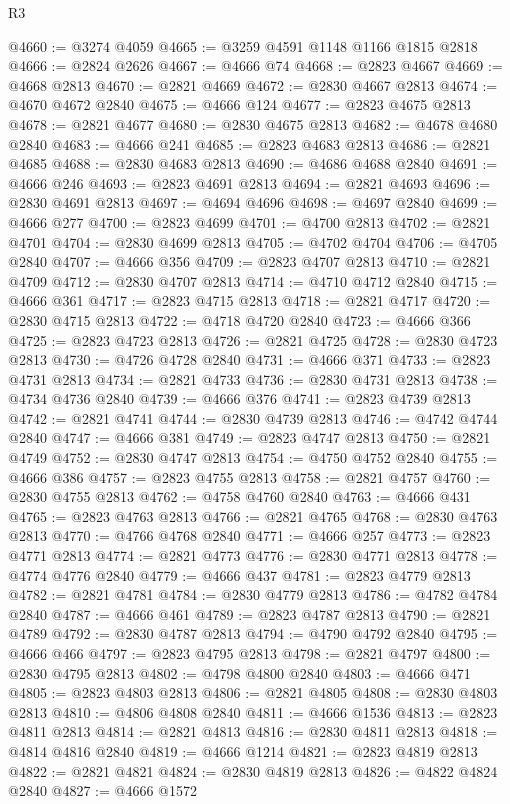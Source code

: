 \begin{lexlean}{R3}
\begin{coremodule}
@4660 := @3274 @4059
@4665 := @3259 @4591 @1148 @1166 @1815 @2818
@4666 := @2824 @2626
@4667 := @4666 @74
@4668 := @2823 @4667
@4669 := @4668 @2813
@4670 := @2821 @4669
@4672 := @2830 @4667 @2813
@4674 := @4670 @4672 @2840
@4675 := @4666 @124
@4677 := @2823 @4675 @2813
@4678 := @2821 @4677
@4680 := @2830 @4675 @2813
@4682 := @4678 @4680 @2840
@4683 := @4666 @241
@4685 := @2823 @4683 @2813
@4686 := @2821 @4685
@4688 := @2830 @4683 @2813
@4690 := @4686 @4688 @2840
@4691 := @4666 @246
@4693 := @2823 @4691 @2813
@4694 := @2821 @4693
@4696 := @2830 @4691 @2813
@4697 := @4694 @4696
@4698 := @4697 @2840
@4699 := @4666 @277
@4700 := @2823 @4699
@4701 := @4700 @2813
@4702 := @2821 @4701
@4704 := @2830 @4699 @2813
@4705 := @4702 @4704
@4706 := @4705 @2840
@4707 := @4666 @356
@4709 := @2823 @4707 @2813
@4710 := @2821 @4709
@4712 := @2830 @4707 @2813
@4714 := @4710 @4712 @2840
@4715 := @4666 @361
@4717 := @2823 @4715 @2813
@4718 := @2821 @4717
@4720 := @2830 @4715 @2813
@4722 := @4718 @4720 @2840
@4723 := @4666 @366
@4725 := @2823 @4723 @2813
@4726 := @2821 @4725
@4728 := @2830 @4723 @2813
@4730 := @4726 @4728 @2840
@4731 := @4666 @371
@4733 := @2823 @4731 @2813
@4734 := @2821 @4733
@4736 := @2830 @4731 @2813
@4738 := @4734 @4736 @2840
@4739 := @4666 @376
@4741 := @2823 @4739 @2813
@4742 := @2821 @4741
@4744 := @2830 @4739 @2813
@4746 := @4742 @4744 @2840
@4747 := @4666 @381
@4749 := @2823 @4747 @2813
@4750 := @2821 @4749
@4752 := @2830 @4747 @2813
@4754 := @4750 @4752 @2840
@4755 := @4666 @386
@4757 := @2823 @4755 @2813
@4758 := @2821 @4757
@4760 := @2830 @4755 @2813
@4762 := @4758 @4760 @2840
@4763 := @4666 @431
@4765 := @2823 @4763 @2813
@4766 := @2821 @4765
@4768 := @2830 @4763 @2813
@4770 := @4766 @4768 @2840
@4771 := @4666 @257
@4773 := @2823 @4771 @2813
@4774 := @2821 @4773
@4776 := @2830 @4771 @2813
@4778 := @4774 @4776 @2840
@4779 := @4666 @437
@4781 := @2823 @4779 @2813
@4782 := @2821 @4781
@4784 := @2830 @4779 @2813
@4786 := @4782 @4784 @2840
@4787 := @4666 @461
@4789 := @2823 @4787 @2813
@4790 := @2821 @4789
@4792 := @2830 @4787 @2813
@4794 := @4790 @4792 @2840
@4795 := @4666 @466
@4797 := @2823 @4795 @2813
@4798 := @2821 @4797
@4800 := @2830 @4795 @2813
@4802 := @4798 @4800 @2840
@4803 := @4666 @471
@4805 := @2823 @4803 @2813
@4806 := @2821 @4805
@4808 := @2830 @4803 @2813
@4810 := @4806 @4808 @2840
@4811 := @4666 @1536
@4813 := @2823 @4811 @2813
@4814 := @2821 @4813
@4816 := @2830 @4811 @2813
@4818 := @4814 @4816 @2840
@4819 := @4666 @1214
@4821 := @2823 @4819 @2813
@4822 := @2821 @4821
@4824 := @2830 @4819 @2813
@4826 := @4822 @4824 @2840
@4827 := @4666 @1572

\end{coremodule}
\end{lexlean}
